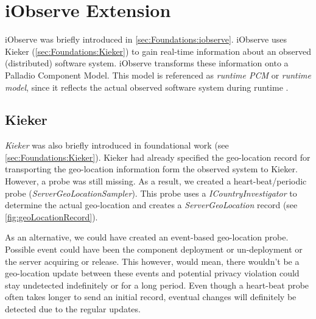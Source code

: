 
\chapter{iObserve Extension}
\label{ch:iObserve}

iObserve was briefly introduced in \autoref{sec:Foundations:iobserve}. iObserve uses Kieker (\autoref{sec:Foundations:Kieker}) to gain real-time information about an observed (distributed) software system. iObserve transforms these information onto a Palladio Component Model. This model is referenced as \textit{runtime PCM} or \textit{runtime model}, since it reflects the actual observed software system during runtime \cite{Heinrich.2016}.


\section{Kieker}
\label{sec:Kieker:privacy}

\textit{Kieker} was also briefly introduced in foundational work (see \autoref{sec:Foundations:Kieker}). Kieker had already specified the geo-location record for transporting the geo-location information form the observed system to Kieker. However, a probe was still missing. As a result, we created a heart-beat/periodic probe (\textit{ServerGeoLocationSampler}). This probe uses a \textit{ICountryInvestigator} to determine the actual geo-location and creates a \textit{ServerGeoLocation} record (see \autoref{fig:geoLocationRecord}).

As an alternative, we could have created an event-based geo-location probe. Possible event could have been the component deployment or un-deployment or the server acquiring or release. This however, would mean, there wouldn't be a geo-location update between these events and potential privacy violation could stay undetected indefinitely or for a long period. Even though a heart-beat probe often takes longer to send an initial record, eventual changes will definitely be detected due to the regular updates.


